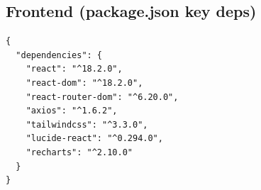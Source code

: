 \documentclass[11pt]{article}
\begin{document}
\subsection{Frontend (package.json key deps)}
\begin{lstlisting}[basicstyle=\ttfamily\small]
{
  "dependencies": {
    "react": "^18.2.0",
    "react-dom": "^18.2.0",
    "react-router-dom": "^6.20.0",
    "axios": "^1.6.2",
    "tailwindcss": "^3.3.0",
    "lucide-react": "^0.294.0",
    "recharts": "^2.10.0"
  }
}
\end{lstlisting}
\end{document}
